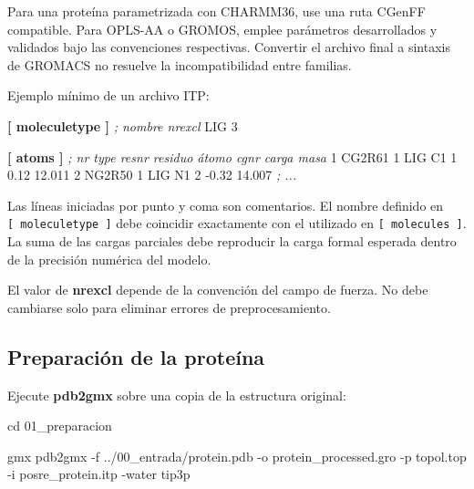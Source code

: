 \documentclass[
  spanish,
  11pt,
  a4paper]{article}
\newenvironment{Shaded}{\begin{snugshade}}{\end{snugshade}}
\newcommand{\AttributeTok}[1]{\textcolor[rgb]{0.13,0.29,0.53}{#1}}
\newcommand{\BuiltInTok}[1]{#1}
\newcommand{\CommentTok}[1]{\textcolor[rgb]{0.56,0.35,0.01}{\textit{#1}}}
\newcommand{\DataTypeTok}[1]{\textcolor[rgb]{0.13,0.29,0.53}{#1}}
\newcommand{\ExtensionTok}[1]{#1}
\newcommand{\KeywordTok}[1]{\textcolor[rgb]{0.13,0.29,0.53}{\textbf{#1}}}
\newcommand{\NormalTok}[1]{#1}
\begin{document}
Para una proteína parametrizada con CHARMM36, use una ruta CGenFF
compatible. Para OPLS-AA o GROMOS, emplee parámetros desarrollados y
validados bajo las convenciones respectivas. Convertir el archivo final
a sintaxis de GROMACS no resuelve la incompatibilidad entre familias.

Ejemplo mínimo de un archivo ITP:

\begin{Shaded}
\begin{Highlighting}[]
\KeywordTok{[ moleculetype ]}
\CommentTok{; nombre   nrexcl}
\DataTypeTok{LIG        3}

\KeywordTok{[ atoms ]}
\CommentTok{; nr  type  resnr  residuo  átomo  cgnr  carga  masa}
\DataTypeTok{1     CG2R61  1     LIG      C1     1     0.12   12.011}
\DataTypeTok{2     NG2R50  1     LIG      N1     2    {-}0.32   14.007}
\CommentTok{; ...}
\end{Highlighting}
\end{Shaded}

Las líneas iniciadas por punto y coma son comentarios. El nombre
definido en \texttt{{[}\ moleculetype\ {]}} debe coincidir exactamente
con el utilizado en \texttt{{[}\ molecules\ {]}}. La suma de las cargas
parciales debe reproducir la carga formal esperada dentro de la
precisión numérica del modelo.

El valor de \textbf{nrexcl} depende de la convención del campo de
fuerza. No debe cambiarse solo para eliminar errores de
preprocesamiento.

\subsection{Preparación de la
proteína}\label{preparaciuxf3n-de-la-proteuxedna}

Ejecute \textbf{pdb2gmx} sobre una copia de la estructura original:

\begin{Shaded}
\begin{Highlighting}[]
\BuiltInTok{cd}\NormalTok{ 01\_preparacion}

\ExtensionTok{gmx}\NormalTok{ pdb2gmx     }\AttributeTok{{-}f}\NormalTok{ ../00\_entrada/protein.pdb     }\AttributeTok{{-}o}\NormalTok{ protein\_processed.gro     }\AttributeTok{{-}p}\NormalTok{ topol.top     }\AttributeTok{{-}i}\NormalTok{ posre\_protein.itp     }\AttributeTok{{-}water}\NormalTok{ tip3p}
\end{Highlighting}
\end{Shaded}
\end{document}
